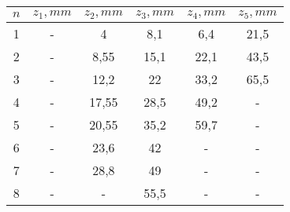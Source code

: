 \begin{tabular}{| c | c | c | c | c | c |}
    \hline
        $n$ & $z_1, mm$ & $z_2, mm$ & $z_3, mm$ & $z_4, mm$  & $z_5, mm$\\
    \hline
        1 & - & 4 & 8,1 & 6,4 & 21,5\\
    \hline
        2 & - & 8,55 & 15,1 & 22,1 & 43,5\\
    \hline
        3 & - & 12,2 & 22 & 33,2 & 65,5\\
    \hline
        4 & - & 17,55 & 28,5 & 49,2 & -\\
    \hline
        5 & - & 20,55 & 35,2 & 59,7 & -\\
    \hline
        6 & - & 23,6 & 42 & - & -\\
    \hline
        7 & - & 28,8 & 49 & - & -\\
    \hline
        8 & - & - & 55,5 & - & -\\
  \hline
  \end{tabular}
